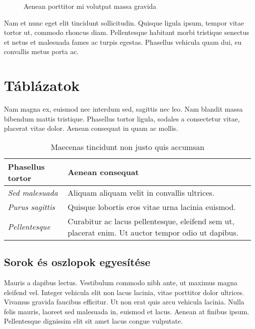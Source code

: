 \begin{figure}[H]
	\centering
	\hspace{5pt}
	\caption{Aenean porttitor mi volutpat massa gravida}
	\label{fig:example-2}
\end{figure}

Nam et nunc eget elit tincidunt sollicitudin. Quisque ligula ipsum, tempor vitae tortor ut, commodo rhoncus diam. Pellentesque habitant morbi tristique senectus et netus et malesuada fames ac turpis egestas. Phasellus vehicula quam dui, eu convallis metus porta ac.


\section{Táblázatok} %

Nam magna ex, euismod nec interdum sed, sagittis nec leo. Nam blandit massa bibendum mattis tristique. Phasellus tortor ligula, sodales a consectetur vitae, placerat vitae dolor. Aenean consequat in quam ac mollis. 

\begin{table}[H]
	\centering
	\begin{tabular}{ | m{} | m{} | }
		\hline
		\textbf{Phasellus tortor} & \textbf{Aenean consequat} \\
		\hline \hline
		\emph{Sed malesuada} & Aliquam aliquam velit in convallis ultrices. \\
		\hline
		\emph{Purus sagittis} &  Quisque lobortis eros vitae urna lacinia euismod. \\
		\hline
		\emph{Pellentesque} & Curabitur ac lacus pellentesque, eleifend sem ut, placerat enim. Ut auctor tempor odio ut dapibus. \\
		\hline
	\end{tabular}
	\caption{Maecenas tincidunt non justo quis accumsan}
	\label{tab:example-1}
\end{table}

\subsection{Sorok és oszlopok egyesítése} %

Mauris a dapibus lectus. Vestibulum commodo nibh ante, ut maximus magna eleifend vel. Integer vehicula elit non lacus lacinia, vitae porttitor dolor ultrices. Vivamus gravida faucibus efficitur. Ut non erat quis arcu vehicula lacinia. Nulla felis mauris, laoreet sed malesuada in, euismod et lacus. Aenean at finibus ipsum. Pellentesque dignissim elit sit amet lacus congue vulputate.

